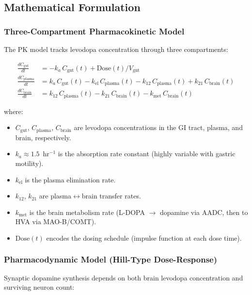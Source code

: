 \subsection{Mathematical Formulation}

\subsubsection{Three-Compartment Pharmacokinetic Model}

The PK model tracks levodopa concentration through three compartments:

\begin{align}
\frac{dC_\text{gut}}{dt} &= -k_a \, C_\text{gut}(t) + \text{Dose}(t) / V_\text{gut} \label{eq:pk-gut} \\
\frac{dC_\text{plasma}}{dt} &= k_a \, C_\text{gut}(t) - k_\text{el} \, C_\text{plasma}(t) - k_{12} \, C_\text{plasma}(t) + k_{21} \, C_\text{brain}(t) \label{eq:pk-plasma} \\
\frac{dC_\text{brain}}{dt} &= k_{12} \, C_\text{plasma}(t) - k_{21} \, C_\text{brain}(t) - k_\text{met} \, C_\text{brain}(t) \label{eq:pk-brain}
\end{align}

where:
\begin{itemize}
\item $C_\text{gut}$, $C_\text{plasma}$, $C_\text{brain}$ are levodopa concentrations in the GI tract, plasma, and brain, respectively.
\item $k_a \approx 1.5$~hr$^{-1}$ is the absorption rate constant (highly variable with gastric motility).
\item $k_\text{el}$ is the plasma elimination rate.
\item $k_{12}$, $k_{21}$ are plasma$\leftrightarrow$brain transfer rates.
\item $k_\text{met}$ is the brain metabolism rate (L-DOPA $\to$ dopamine via AADC, then to HVA via MAO-B/COMT).
\item $\text{Dose}(t)$ encodes the dosing schedule (impulse function at each dose time).
\end{itemize}

\subsubsection{Pharmacodynamic Model (Hill-Type Dose-Response)}

Synaptic dopamine synthesis depends on both brain levodopa concentration and surviving neuron count:

